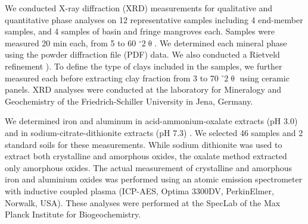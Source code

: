 We conducted X-ray diffraction (XRD) measurements for qualitative and quantitative phase analyses \citep{spiess2009} on 12 representative samples including 4 end-member samples, and 4 samples of basin and fringe mangroves each. Samples were measured 20 min each, from 5 to 60 $^{\circ}2\uptheta$. We determined each mineral phase using the powder diffraction file (PDF) data. We also conducted a Rietveld refinement \DIFdelbegin {}\DIFdelend \DIFaddbegin {}\DIFaddend ). To define the type of clays included in the samples, we further measured each \DIFaddbegin {}\DIFaddend before extracting clay fraction from 3 to 70 $^{\circ}2\uptheta$ using ceramic panels. XRD analyses were conducted at the laboratory for Mineralogy and Geochemistry of the Friedrich-Schiller University in Jena, Germany.

We determined iron and aluminum in acid-ammonium-oxalate extracts (pH 3.0) and in sodium-citrate-dithionite extracts (pH 7.3) \citep{Schwertmann, Holmgren1967}. We selected 46 samples and 2 standard soils for these measurements. While sodium dithionite was used to extract both crystalline and amorphous oxides, the oxalate method extracted only amorphous oxides. The actual measurement of crystalline and amorphous iron and aluminium oxides was performed using an atomic emission spectrometer with inductive coupled plasma (ICP-AES, Optima 3300DV, PerkinElmer, Norwalk, USA). These analyses were performed at the SpecLab of the Max Planck Institute for Biogeochemistry. 

